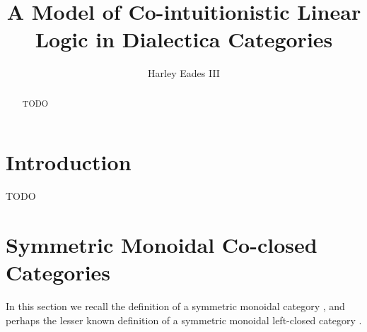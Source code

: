\documentclass{llncs}
\date{}
\begin{document}
\title{A Model of Co-intuitionistic Linear Logic in Dialectica Categories}

\author{Harley Eades III}

\maketitle 

\begin{abstract}
  TODO
\end{abstract}

\section{Introduction}
\label{sec:introduction}

TODO \cite{?}

\section{Symmetric Monoidal Co-closed Categories}
\label{sec:symmetric_monoidal_co-closed_categories}

In this section we recall the definition of a symmetric monoidal
category \cite{?}, and perhaps the lesser known definition of a
symmetric monoidal left-closed category \cite{?}.  
\end{document}
